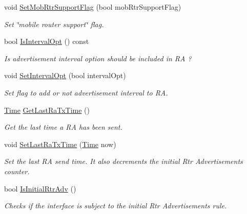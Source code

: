 \begin{DoxyCompactItemize}
void \hyperlink{classns3_1_1RadvdInterface_a64543356f558cdd54892f1d1c399b9dc}{Set\+Mob\+Rtr\+Support\+Flag} (bool mob\+Rtr\+Support\+Flag)
\begin{DoxyCompactList}\small\item\em Set \char`\"{}mobile router support\char`\"{} flag. \end{DoxyCompactList}\item 
bool \hyperlink{classns3_1_1RadvdInterface_a2c19bc45cb0e3da5de07932ec51b322d}{Is\+Interval\+Opt} () const 
\begin{DoxyCompactList}\small\item\em Is advertisement interval option should be included in RA ? \end{DoxyCompactList}\item 
void \hyperlink{classns3_1_1RadvdInterface_aa0c25c4739d8f6e76778424c667328d9}{Set\+Interval\+Opt} (bool interval\+Opt)
\begin{DoxyCompactList}\small\item\em Set flag to add or not advertisement interval to RA. \end{DoxyCompactList}\item 
\hyperlink{classns3_1_1Time}{Time} \hyperlink{classns3_1_1RadvdInterface_a65648daa45a5e9124137255dd7d7c219}{Get\+Last\+Ra\+Tx\+Time} ()
\begin{DoxyCompactList}\small\item\em Get the last time a RA has been sent. \end{DoxyCompactList}\item 
void \hyperlink{classns3_1_1RadvdInterface_a67bfe7283e422f471ea31b3ad2bd17fa}{Set\+Last\+Ra\+Tx\+Time} (\hyperlink{classns3_1_1Time}{Time} now)
\begin{DoxyCompactList}\small\item\em Set the last RA send time. It also decrements the initial Rtr Advertisements counter. \end{DoxyCompactList}\item 
bool \hyperlink{classns3_1_1RadvdInterface_a37f4bc41cbfe6c4ada689b2f7e5d197f}{Is\+Initial\+Rtr\+Adv} ()
\begin{DoxyCompactList}\small\item\em Checks if the interface is subject to the initial Rtr Advertisements rule. \end{DoxyCompactList}\end{DoxyCompactItemize}
